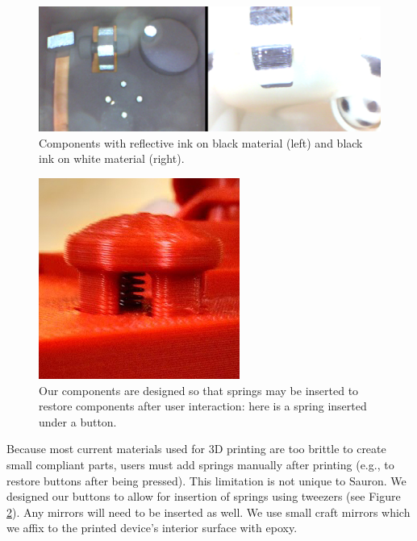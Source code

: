 \begin{figure}
\centering
\includegraphics[width=\textwidth]{figures/sauron/distinctive-materials.png}
\caption{Components with reflective ink on black material (left) and black ink on white material (right).}
\label{fig:sauron-distinctiveness}
\end{figure}

\begin{figure}
\centering
\includegraphics[width=\textwidth]{figures/sauron/button-spring.jpg}
\caption{Our components are designed so that springs may be inserted to restore components after user interaction: here is a spring inserted under a button.}
\label{fig:sauron-spring}
\end{figure}

Because most current materials used for 3D printing are too brittle to create small compliant parts, users must add springs manually after printing (e.g., to restore buttons after being pressed). This limitation is not unique to Sauron. We designed our buttons to allow for insertion of springs using tweezers (see Figure \ref{fig:sauron-spring}). Any mirrors will need to be inserted as well. We use small craft mirrors which we affix to the printed device's interior surface with epoxy.

